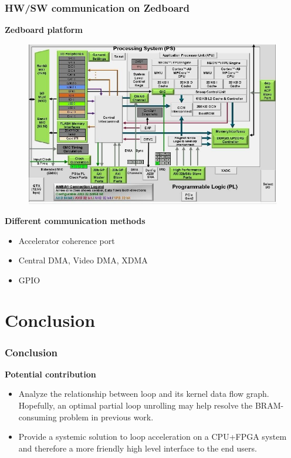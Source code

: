 \documentclass{beamer}
\begin{document}
\begin{frame}[t]
\frametitle{HW/SW communication on Zedboard}

\vspace{-1em}
\textbf{Zedboard platform}
\begin{figure}
\includegraphics[width=0.7\linewidth]{zynq}
\end{figure}
\textbf{Different communication methods}
\begin{itemize}
\item Accelerator coherence port
\item Central DMA, Video DMA, XDMA
\item GPIO
\end{itemize}

\end{frame}

\section{Conclusion}
\begin{frame}[t]
\frametitle{Conclusion}

\vspace{-1em}
\textbf{Potential contribution}
\begin{itemize}
\item Analyze the relationship between loop and its kernel data flow graph. Hopefully, an optimal
partial loop unrolling may help resolve the BRAM-consuming problem in previous work.  
\item Provide a systemic solution to loop acceleration on a CPU+FPGA system and therefore a more friendly
high level interface to the end users.
\end{itemize}

\end{frame}

\end{document}

